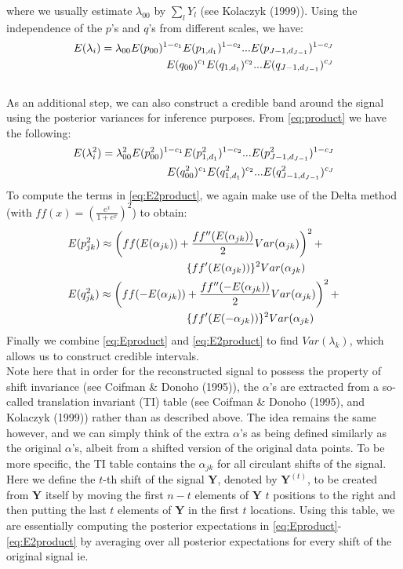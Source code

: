\documentclass[12pt]{article}
\newcommand{\Ga}{\alpha}
\newcommand{\Gl}{\lambda}    \newcommand{\GL}{\Lambda}
\begin{document}
\begin{appendices}
where we usually estimate $\Gl_{00}$ by $\sum_l Y_l$ (see Kolaczyk (1999)). Using the independence of the $p$'s and $q$'s from different scales, we have:
\begin{eqnarray}\label{eq:Eproduct}E(\Gl_i)=\Gl_{00}E(p_{00})^{1-c_1}E(p_{1,d_1})^{1-c_2}...E(p_{J-1,d_{J-1}})^{1-c_J}\notag\\
E(q_{00})^{c_1}E(q_{1,d_1})^{c_2}...E(q_{J-1,d_{J-1}})^{c_J}\end{eqnarray}
\bigskip\\
As an additional step, we can also construct a credible band around the signal using the posterior variances for inference purposes. From \eqref{eq:product} we have the following:
\begin{eqnarray}\label{eq:E2product}E(\Gl_i^2)=\Gl_{00}^2E(p_{00}^2)^{1-c_1}E(p_{1,d_1}^2)^{1-c_2}...E(p_{J-1,d_{J-1}}^2)^{1-c_J}\notag\\
E(q_{00}^2)^{c_1}E(q_{1,d_1}^2)^{c_2}...E(q_{J-1,d_{J-1}}^2)^{c_J}\end{eqnarray}
To compute the terms in \eqref{eq:E2product}, we again make use of the Delta method (with $ff(x)=(\frac{e^x}{1+e^x})^2$) to obtain:
\begin{eqnarray}
&E(p_{jk}^2)\approx \left(ff(E(\Ga_{jk}))+\frac{ff''(E(\Ga_{jk}))}{2}Var(\Ga_{jk})\right)^2+\notag\\
& \hspace{1.5 in}\{ff'(E(\Ga_{jk}))\}^2Var(\Ga_{jk})\\
&E(q_{jk}^2)\approx \left(ff(-E(\Ga_{jk}))+\frac{ff''(-E(\Ga_{jk}))}{2}Var(\Ga_{jk})\right)^2+\notag\\
& \hspace{1.5 in}\{ff'(E(-\Ga_{jk}))\}^2Var(\Ga_{jk})
\end{eqnarray}
Finally we combine \eqref{eq:Eproduct} and \eqref{eq:E2product} to find $Var(\Gl_k)$, which allows us to construct credible intervals.\bigskip\\
Note here that in order for the reconstructed signal to possess the property of shift invariance (see Coifman \& Donoho (1995)), the $\Ga$'s are extracted from a so-called translation invariant (TI) table (see Coifman \& Donoho (1995), and Kolaczyk (1999)) rather than as described above. The idea remains the same however, and we can simply think of the extra $\Ga$'s as being defined similarly as the original $\Ga$'s, albeit from a shifted version of the original data points. To be more specific, the TI table contains the $\Ga_{jk}$ for all circulant shifts of the signal. Here we define the $t$-th shift of the signal $\bm{Y}$, denoted by $\bm{Y}^{(t)}$, to be created from $\bm{Y}$ itself by moving the first $n-t$ elements of $\bm{Y}$ $t$ positions to the right and then putting the last $t$ elements of $\bm{Y}$ in the first $t$ locations. Using this table, we are essentially computing the posterior expectations in \eqref{eq:Eproduct}-\eqref{eq:E2product} by averaging over all posterior expectations for every shift of the original signal ie.

\end{appendices}
\end{document}
